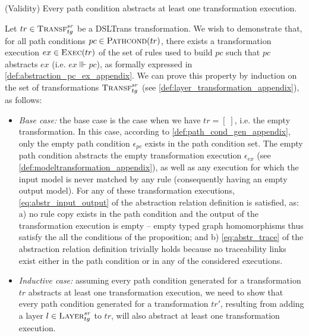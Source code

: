 \begin{proposition}{(Validity)}
\label{prop:pc_validity_appendix}
Every path condition abstracts at least one transformation execution.
\end{proposition}
\begin{pf}
Let $tr\in \textsc{Transf}^{sr}_{tg}$ be a DSLTrans transformation. We wish to demonstrate that, for all path conditions $pc\in \textsc{Pathcond}(tr)$, there exists a transformation execution $ex\in \textsc{Exec}(tr)$ of the set of rules used to build $pc$ such that $pc$ abstracts $ex$ (i.e. $ex\Vvdash pc$), as formally expressed in \cref{def:abstraction_pc_ex_appendix}. We can prove this property by induction on the set of transformations $\textsc{Transf}^{sr}_{tg}$ (see \cref{def:layer_transformation_appendix}), as follows:


\begin{itemize}
  \item \emph{Base case:} the base case is the case when we have $tr=[\;]$, i.e. the empty transformation. In this case, according to \cref{def:path_cond_gen_appendix}, only the empty path condition $\epsilon_{pc}$ exists in the path condition set. The empty path condition abstracts the empty transformation execution $\epsilon_{ex}$ (see \cref{def:modeltransformation_appendix}), as well as any execution for which the input model is never matched by any rule (consequently having an empty output model). For any of these transformation executions, \cref{eq:abstr_input_output} of the abstraction relation definition is satisfied, as: a) no rule copy exists in the path condition and the output of the transformation execution is empty -- empty typed graph homomorphisms thus satisfy the all the conditions of the proposition; and b) \cref{eq:abstr_trace} of the abstraction relation definition trivially holds because no traceability links exist either in the path condition or in any of the considered executions.

\item \emph{Inductive case:} assuming every path condition generated for a transformation $tr$ abstracts at least one transformation execution, we need to show that every path condition generated for a transformation $tr'$, resulting from adding a layer $l\in \textsc{Layer}^{sr}_{tg}$ to $tr$, will also abstract at least one transformation execution. 
\end{itemize}


\end{pf}
